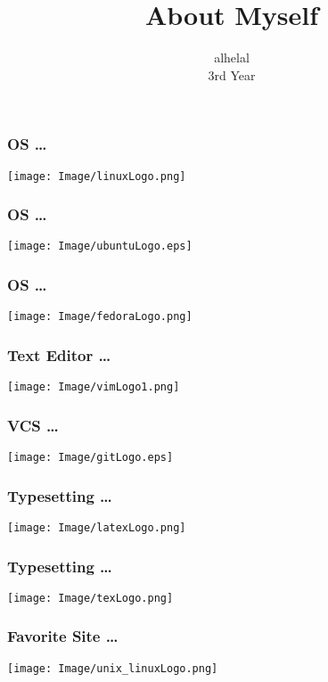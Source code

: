 \documentclass{beamer}
\begin{document}
\title{About Myself}
\author{alhelal\\3rd Year}
\maketitle
\begin{frame}
  \frametitle{OS \ldots}
  \begin{center}
    \texttt{[image: Image/linuxLogo.png]}
  \end{center}
\end{frame}
\begin{frame}
  \frametitle{OS \ldots}
  \begin{center}
    \texttt{[image: Image/ubuntuLogo.eps]}
  \end{center}
\end{frame}
\begin{frame}
  \frametitle{OS \ldots}
  \begin{center}
    \texttt{[image: Image/fedoraLogo.png]}
  \end{center}
\end{frame}
\begin{frame}
  \frametitle{Text Editor \ldots}
  \begin{center}
    \texttt{[image: Image/vimLogo1.png]}
  \end{center}
\end{frame}
\begin{frame}
  \frametitle{VCS \ldots}
  \begin{center}
    \texttt{[image: Image/gitLogo.eps]}
  \end{center}
\end{frame}
\begin{frame}
  \frametitle{Typesetting \ldots}
  \begin{center}
    \texttt{[image: Image/latexLogo.png]}
  \end{center}
\end{frame}
\begin{frame}
  \frametitle{Typesetting \ldots}
  \begin{center}
    \texttt{[image: Image/texLogo.png]}
  \end{center}
\end{frame}
\begin{frame}
  \frametitle{Favorite Site \ldots}
  \begin{center}
    \texttt{[image: Image/unix\_linuxLogo.png]}
  \end{center}
\end{frame}
\end{document}
